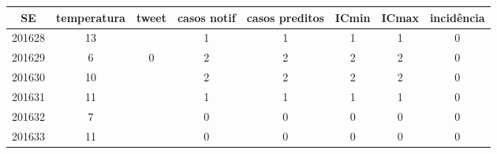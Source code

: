 \begin{tabular}{c|ccccccc}
  \hline
SE & temperatura & tweet & casos notif & casos preditos & ICmin & ICmax & incidência \\ 
  \hline
201628 & 13 &  & 1 & 1 & 1 & 1 & 0 \\ 
  201629 & 6 & 0 & 2 & 2 & 2 & 2 & 0 \\ 
  201630 & 10 &  & 2 & 2 & 2 & 2 & 0 \\ 
  201631 & 11 &  & 1 & 1 & 1 & 1 & 0 \\ 
  201632 & 7 &  & 0 & 0 & 0 & 0 & 0 \\ 
  201633 & 11 &  & 0 & 0 & 0 & 0 & 0 \\ 
   \hline
\end{tabular}
